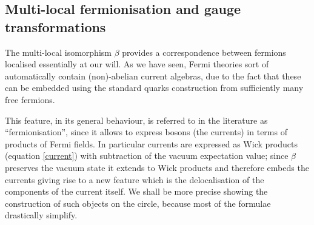 \subsection{Multi-local fermionisation and 
gauge transformations}
\label{multi-local fermionisation}
The multi-local isomorphism $\beta$ provides 
a correspondence between fermions localised 
essentially at our will. As we have seen, Fermi 
theories sort of automatically contain (non)-abelian
current algebras, due to the fact that these can 
be embedded using the standard quarks construction
from sufficiently many free fermions.

This feature, in its general behaviour, is referred to 
in the literature as ``fermionisation'', since it 
allows to express bosons (the currents) in terms 
of products of Fermi fields. In particular currents 
are expressed as Wick products (equation \eqref{current})
with subtraction of the vacuum expectation value;
since $\beta$ preserves the vacuum state it extends to
Wick products and therefore embeds 
the currents giving rise to a new feature which is
the delocalisation of the components of the current
itself. We shall be more precise showing the 
construction of such objects on the circle, because
most of the formulae drastically simplify.

